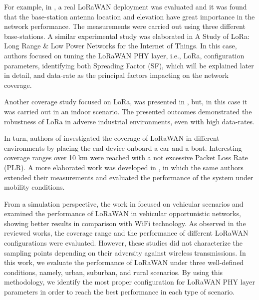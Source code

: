 For example,
	in \cite{petric_measurements_2016-1},
	a real LoRaWAN deployment was evaluated and it was found that the base-station antenna location and elevation have great importance in the network performance.
The measurements were carried out using three different base-stations.
A similar experimental study was elaborated in A Study of LoRa:
	Long Range \& Low Power Networks for the Internet of Things.
In this case,
	authors focused on tuning the LoRaWAN PHY layer,
	i.e.,
	LoRa,
	configuration parameters,
	identifying both Spreading Factor (SF),
	which will be explained later in detail,
	and data-rate as the principal factors impacting on the network coverage.

Another coverage study focused on LoRa,
	was presented in \cite{haxhibeqiri_lora_2017},
	but,
	in this case it was carried out in an indoor scenario.
The presented outcomes demonstrated the robustness of LoRa in adverse industrial environments,
	even with high data-rates.

In turn,
	authors of \cite{petajajarvi_coverage_2015} investigated the coverage of LoRaWAN in different environments by placing the end-device onboard a car and a boat.
Interesting coverage ranges over 10 km were reached with a not excessive Packet Loss Rate (PLR).
A more elaborated work was developed in \cite{petajajarvi_performance_2017},
	in which the same authors extended their measurements and evaluated the performance of the system under mobility conditions.

From a simulation perspective,
	the work in \cite{herrera-tapia_evaluating_2017} focused on vehicular scenarios and examined the performance of LoRaWAN in vehicular opportunistic networks,
	showing better results in comparison with WiFi technology.
As observed in the reviewed works,
	the coverage range and the performance of different LoRaWAN configurations were evaluated.
However,
	these studies did not characterize the sampling points depending on their adversity against wireless transmissions.
In this work,
	we evaluate the performance of LoRaWAN under three well-defined conditions,
	namely,
	urban,
	suburban,
	and rural scenarios.
By using this methodology,
	we identify the most proper configuration for LoRaWAN PHY layer parameters in order to reach the best performance in each type of scenario.

